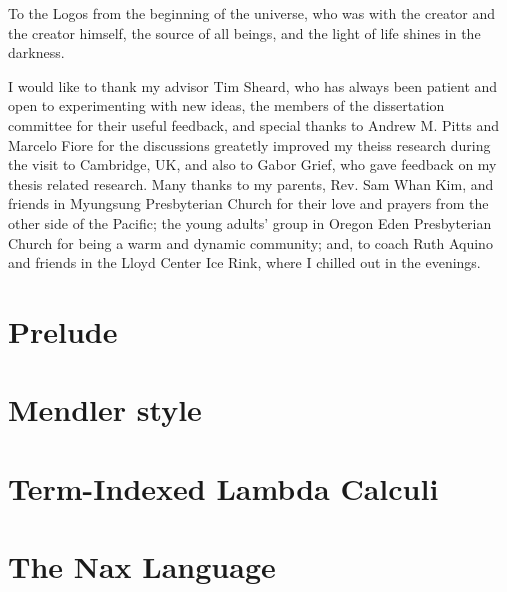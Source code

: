 \documentclass[12pt]{report}
\theoremstyle{definition}
\theoremstyle{remark}
\numberwithin{definition}{section}
\numberwithin{equation}{section}
\numberwithin{proposition}{section}
\numberwithin{conjecture}{section}
\numberwithin{theorem}{section}
\numberwithin{lemma}{section}
\numberwithin{corollary}{section}
\numberwithin{example}{section}
\numberwithin{remark}{section}
\begin{document}
To the Logos from the beginning of the universe, who was with the creator
and the creator himself, the source of all beings, and the light of life
shines in the darkness.

I would like to thank my advisor Tim Sheard, who has always been patient and
open to experimenting with new ideas, the members of the dissertation committee
for their useful feedback, and special thanks to Andrew M. Pitts and
Marcelo Fiore for the discussions greatetly improved my theiss research
during the visit to Cambridge, UK, and also to Gabor Grief, who gave feedback on
my thesis related research. Many thanks to my parents,
Rev. Sam Whan Kim, and friends in Myungsung Presbyterian Church for their
love and prayers from the other side of the Pacific; the young adults' group
in Oregon Eden Presbyterian Church for being a warm and dynamic community; and,
to coach Ruth Aquino and friends in the Lloyd Center Ice Rink, where I chilled
out in the evenings.

\afterpreface
\body

\part{Prelude}\label{part:Prelude}

\part{Mendler style}\label{part:Mendler}

\part{Term-Indexed Lambda Calculi}\label{part:Calculi}

\part{The Nax Language}\label{part:Nax}
\end{document}
